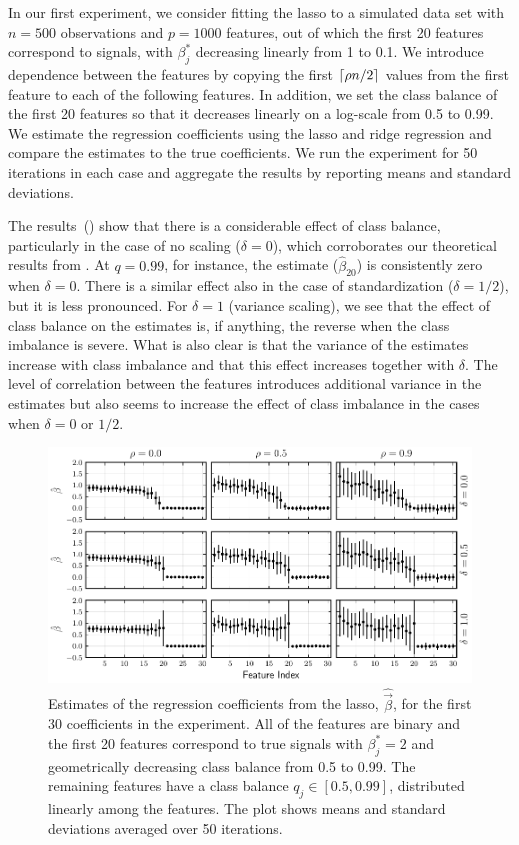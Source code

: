 In our first experiment, we consider fitting the lasso to a simulated data set with \(n=500\) observations and \(p = \num{1000}\) features, out of which the first 20 features correspond to signals, with \(\beta_j^*\) decreasing linearly from 1 to 0.1.
We introduce dependence between the features by copying the first \(\lceil \rho n/2 \rceil\) values from the first feature to each of the following features.
In addition, we set the class balance of the first 20 features so that it decreases linearly on a log-scale from 0.5 to 0.99.
We estimate the regression coefficients using the lasso and ridge regression and compare the estimates to the true coefficients. We run the experiment for 50 iterations in each case and aggregate the results by reporting means and standard deviations.

The results~() show that there is a considerable effect of class balance, particularly in the case of no scaling (\(\delta = 0\)), which corroborates our theoretical results from . At \(q=0.99\), for instance, the estimate (\(\hat{\beta}_{20}\)) is consistently zero when \(\delta = 0\). There is a similar effect also in the case of standardization (\(\delta = 1/2\)), but it is less pronounced. For \(\delta=1\) (variance scaling), we see that the effect of class balance on the estimates is, if anything, the reverse when the class imbalance is severe. What is also clear is that the variance of the estimates increase with class imbalance and that this effect increases together with \(\delta\). The level of correlation between the features introduces additional variance in the estimates but also seems to increase the effect of class imbalance in the cases when \(\delta = 0\) or \(1/2\).

\begin{figure}[htpb]
  \centering
  \includegraphics[]{plots/binary_decreasing.pdf}
  \caption{%
    Estimates of the regression coefficients from the lasso, \(\hat{\vec{\beta}}\), for the first 30 coefficients in the experiment. All of the features are binary and the first 20 features correspond to true signals with \(\beta_j^* = 2\) and geometrically decreasing class balance from 0.5 to 0.99. The remaining features have a class balance \(q_j \in [0.5, 0.99]\), distributed linearly among the features. The plot shows means and standard deviations averaged over 50 iterations.}
  \label{fig:binary-decreasing}
\end{figure}

